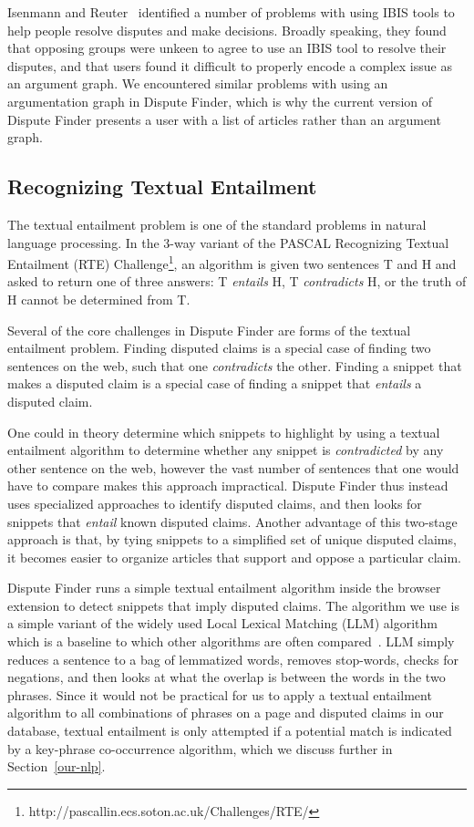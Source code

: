 \documentclass{www2010-submission}
\newcommand{\todo}[1]{}
\begin{document}
Isenmann and Reuter~\cite{Isenmann1997} identified a number of problems with using IBIS tools to help people resolve disputes and make decisions. Broadly speaking, they found that opposing groups were unkeen to agree to use an IBIS tool to resolve their disputes, and that users found it difficult to properly encode a complex issue as an argument graph. We encountered similar problems with using an argumentation graph in Dispute Finder, which is why the current version of Dispute Finder presents a user with a list of articles rather than an argument graph.


\subsection{Recognizing Textual Entailment}
\label{related:entailment}

\todo{Trim this down??}

The textual entailment problem is one of the standard problems in natural language processing. In the 3-way variant of the PASCAL Recognizing Textual Entailment (RTE) Challenge\footnote{http://pascallin.ecs.soton.ac.uk/Challenges/RTE/}, an algorithm is given two sentences T and H and asked to return one of three answers: T {\it entails} H, T {\it contradicts} H, or the truth of H cannot be determined from T. 

Several of the core challenges in Dispute Finder are forms of the textual entailment problem. Finding disputed claims is a special case of finding two sentences on the web, such that one {\it contradicts} the other. Finding a snippet that makes a disputed claim is a special case of finding a snippet that {\it entails} a disputed claim. 

One could in theory determine which snippets to highlight by using a textual entailment algorithm to determine whether any snippet is {\it contradicted} by any other sentence on the web, however the vast number of sentences that one would have to compare makes this approach impractical. Dispute Finder thus instead uses specialized approaches to identify disputed claims, and then looks for snippets that {\it entail} known disputed claims. Another advantage of this two-stage approach is that, by tying snippets to a simplified set of unique disputed claims, it becomes easier to organize articles that support and oppose a particular claim.

Dispute Finder runs a simple textual entailment algorithm inside the browser extension to detect snippets that imply disputed claims. The algorithm we use is a simple variant of the widely used Local Lexical Matching (LLM) algorithm~\cite{Jijkoun2006} which is a baseline to which other algorithms are often compared~\cite{Braz}. LLM simply reduces a sentence to a bag of lemmatized words, removes stop-words, checks for negations, and then looks at what the overlap is between the words in the two phrases. Since it would not be practical for us to apply a textual entailment algorithm to all combinations of phrases on a page and disputed claims in our database, textual entailment is only attempted if a potential match is indicated by a key-phrase co-occurrence algorithm, which we discuss further in Section~\ref{our-nlp}.
\end{document}
